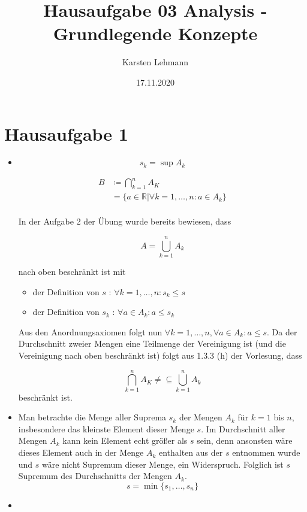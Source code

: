\documentclass{article}
\author{Karsten Lehmann}
\date{17.11.2020}
\title{Hausaufgabe 03 Analysis - Grundlegende Konzepte}
\begin{document}
\maketitle
\newpage

\section*{Hausaufgabe 1}
\begin{itemize}
\item
  \[
    s_k = \sup A_k
  \]
  
  \begin{align*}
    B &\coloneqq \bigcap_{k = 1}^n A_K \\
      &= \{ a \in \mathbb{R} | \forall k = 1, \ldots, n \colon  a \in A_k \} \\
  \end{align*}
  
  In der Aufgabe 2 der Übung wurde bereits bewiesen, dass
  
  \[
    A = \bigcup_{k = 1}^n A_k
  \]
  
  nach oben beschränkt ist mit
  \begin{itemize}
  \item der Definition von $s$ : $\forall k = 1, \ldots, n \colon s_k \leq s$
  \item der Definition von $s_k$ : $\forall a \in A_k \colon a \leq s_k$
  \end{itemize}

  Aus den Anordnungsaxiomen folgt nun $\forall k = 1, \ldots, n, \forall a \in A_k \colon a \leq s$. Da der Durchschnitt zweier Mengen eine
  Teilmenge der Vereinigung ist (und die Vereinigung nach oben beschränkt ist) folgt aus 1.3.3 (h) der Vorlesung, dass
  
  \[
    \bigcap_{k = 1}^n A_K \ne \subseteq \bigcup_{k = 1}^n A_k
  \]
  beschränkt ist. \\
\item
  Man betrachte die Menge aller Suprema $s_k$ der Mengen $A_k$ für $k = 1$ bis $n$, insbesondere das kleinste Element dieser Menge $s$.
  Im Durchschnitt aller Mengen $A_k$ kann kein Element echt größer als $s$ sein, denn ansonsten wäre dieses Element
  auch in der Menge $A_k$ enthalten aus der $s$ entnommen wurde und $s$ wäre nicht Supremum dieser Menge, ein Widerspruch.
  Folglich ist $s$ Supremum des Durchschnitts der Mengen $A_k$.
  \[
    s = \min \{ s_1, \ldots, s_n \}
  \]
\item
\end{itemize}
\end{document}
